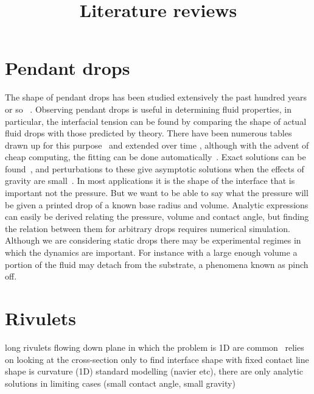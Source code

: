 \documentclass[a4paper]{article}
\title{Literature reviews}
\date{}
\begin{document}
\maketitle





\section{Pendant drops}
 
The shape of pendant drops has been studied extensively   the past hundred years or so ~\cite{Gauss1877PrincipiaAequilibrii,thomson1886CapillaryAttraction}. 
Observing pendant drops is useful in determining fluid properties, in particular, the interfacial tension can be found by comparing the shape of actual fluid drops with those predicted by theory.
There have been numerous tables drawn up for this purpose~\cite{Bashforth1883AnAction} and extended over time \cite{Fordham1948OnDrops,Mills1953TablesDifferences,Stauffer1965TheTechnique}, although with the advent of cheap computing,    the fitting can be done automatically~\cite{Arashiro1999UsePolymers}.     Exact solutions can be found~\cite{Chesters1977AnAxis,Hajirahimi2015ExactDrops}, and perturbations to these give asymptotic solutions when \eg the effects of gravity are small~\cite{OBrien1991OnTechniques}. 
In most applications it is the shape of the interface that is important not the pressure. But we want to be able to say what the pressure will be given a printed  drop of a known base radius and volume. Analytic expressions can easily be derived relating the pressure, volume and contact angle, but finding the relation between them for arbitrary  drops   requires numerical simulation.  Although we are considering static drops there may be experimental regimes in which the dynamics are important. For instance with a large enough volume a portion of the fluid may detach from the substrate, a phenomena known as pinch off. 




\section{Rivulets}
 long rivulets flowing down plane in which the problem is 1D are common~\cite{Towell1966HydrodynamicsFlow} relies on looking at the cross-section only to find interface shape with fixed contact line shape is curvature (1D) standard modelling (navier etc), there are only  analytic solutions in limiting cases (small contact angle, small gravity)
 
\end{document}
